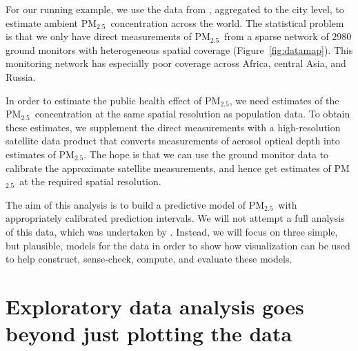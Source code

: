 \documentclass{statsoc}
\newcommand{\PM}{PM$_{2.5}$}
\begin{document}
For our running example, we use the data from \citet{shaddick2017data},
aggregated to the city level, to estimate ambient \PM\ concentration across the
world. The statistical problem is that we only have direct measurements of \PM\
from a sparse network of $2980$ ground monitors with heterogeneous spatial
coverage (Figure~\ref{fig:datamap}). This monitoring network has especially poor
coverage across Africa, central Asia, and Russia.

In order to estimate the public health effect of \PM , we need estimates of the
\PM\ concentration at the  same spatial resolution as  population data. To
obtain these estimates, we supplement the direct measurements with a
high-resolution  satellite data product that converts measurements of aerosol
optical depth into estimates of \PM.  The hope is that we can use the ground
monitor data to calibrate the approximate satellite measurements, and hence get
estimates of \PM\ at the required spatial resolution.

The aim of this analysis is to build a predictive model of \PM\ with
appropriately calibrated prediction intervals.  We will not attempt a full
analysis of this data, which was undertaken by \citet{shaddick2017data}.
Instead, we will focus on three simple, but plausible, models for the data in
order to show how visualization can be used to help construct, sense-check,
compute, and evaluate these models.


\section{Exploratory data analysis goes beyond just plotting the data}
\label{sec:exploratory}
\end{document}
